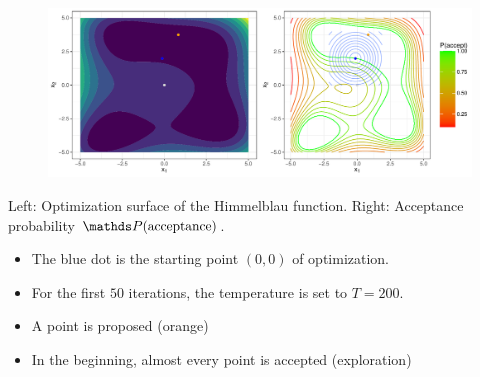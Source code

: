 \documentclass[11pt,compress,t,notes=noshow, xcolor=table]{beamer}
\begin{document}
\begin{frame}
\begin{center}
{    \begin{figure}
      \includegraphics[width=1\textwidth]{figure_man/sa-iter2.pdf}  \\
    \end{figure}
          \begin{tiny}
      Left: Optimization surface of the Himmelblau function. Right: Acceptance probability $\P(\text{acceptance})$. 
      \end{tiny} 

    \begin{itemize}
          \item The blue dot is the starting point $(0, 0)$ of optimization.
          \item For the first $50$ iterations, the temperature is set to $T = 200$. 
          \item A point is proposed (orange)
          \item In the beginning, almost every point is accepted (exploration)
    \end{itemize}}%

\end{center}
\end{frame}
\end{document}
